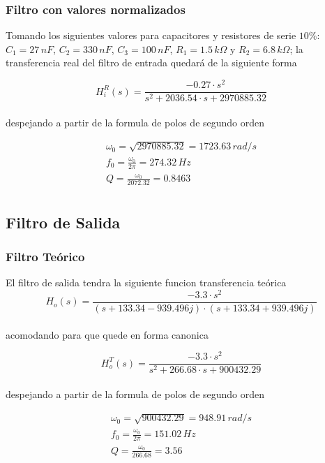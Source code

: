 \documentclass[10pt,a4paper]{article}
\begin{document}
    \subsubsection{Filtro con valores normalizados}

    Tomando los siguientes valores para capacitores y resistores de serie $10\%$:
    $C_{1} = 27 \, nF$, $C_{2} = 330 \, nF$, $C_{3} = 100 \, nF$, $R_{1} = 1.5 \, k\Omega$ y $R_{2} = 6.8 \, k\Omega$; la transferencia real del filtro de entrada quedará de la siguiente forma

    \[H_{i}^{R}(s)=\frac{-0.27 \cdot s^{2}}{s^{2}+2036.54 \cdot s + 2970885.32}\] \\

    despejando a partir de la formula de polos de segundo orden

    \begin{gather*}
        \omega_{0}= \sqrt{2970885.32} = 1723.63 \, rad/s\\
        f_{0}= \frac{\omega_{0}}{2\pi} = 274.32 \, Hz\\
        Q= \frac{\omega_0}{2072.32} = 0.8463\\
    \end{gather*}

    \subsection{Filtro de Salida}\label{subsec:filtro-de-salida}


    \subsubsection{Filtro Teórico}
    El filtro de salida tendra la siguiente funcion transferencia teórica \\

    \[H_o(s)= \frac{-3.3 \cdot s^{2}}{(s +133.34 -939.496j) \cdot (s + 133.34 +939.496j)}\] \\

    acomodando para que quede en forma canonica

    \[H_{o}^{T}(s)=  \frac{-3.3 \cdot s^{2}}{s^{2}+266.68\cdot s + 900432.29}\] \\

    despejando a partir de la formula de polos de segundo orden

    \begin{gather*}
        \omega_{0}= \sqrt{900432.29} = 948.91 \, rad/s\\
        f_{0}= \frac{\omega_{0}}{2\pi} = 151.02 \, Hz\\
        Q= \frac{\omega_{0}}{266.68} = 3.56\\
    \end{gather*} \\
\end{document}
